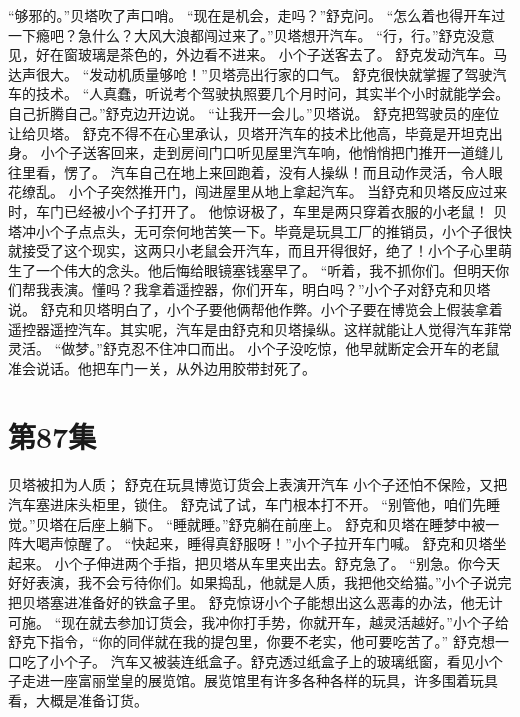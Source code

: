 \documentclass[a4paper,12pt,UTF8,twoside]{ctexbook}
\begin{document}
        “够邪的。”贝塔吹了声口哨。 
        “现在是机会，走吗？”舒克问。 
        “怎么着也得开车过一下瘾吧？急什么？大风大浪都闯过来了。”贝塔想开汽车。 
        “行，行。”舒克没意见，好在窗玻璃是茶色的，外边看不进来。 
        小个子送客去了。 
        舒克发动汽车。马达声很大。 
        “发动机质量够呛！”贝塔亮出行家的口气。 
        舒克很快就掌握了驾驶汽车的技术。 
        “人真蠢，听说考个驾驶执照要几个月时问，其实半个小时就能学会。自己折腾自己。”舒克边开边说。 
        “让我开一会儿。”贝塔说。 
        舒克把驾驶员的座位让给贝塔。 
        舒克不得不在心里承认，贝塔开汽车的技术比他高，毕竟是开坦克出身。 
        小个子送客回来，走到房间门口听见屋里汽车响，他悄悄把门推开一道缝儿往里看，愣了。 
        汽车自己在地上来回跑着，没有人操纵！而且动作灵活，令人眼花缭乱。 
        小个子突然推开门，闯进屋里从地上拿起汽车。 
        当舒克和贝塔反应过来时，车门已经被小个子打开了。 
        他惊讶极了，车里是两只穿着衣服的小老鼠！ 
        贝塔冲小个子点点头，无可奈何地苦笑一下。毕竟是玩具工厂的推销员，小个子很快就接受了这个现实，这两只小老鼠会开汽车，而且开得很好，绝了！小个子心里萌生了一个伟大的念头。他后悔给眼镜塞钱塞早了。 
        “听着，我不抓你们。但明天你们帮我表演。懂吗？我拿着遥控器，你们开车，明白吗？”小个子对舒克和贝塔说。 
        舒克和贝塔明白了，小个子要他俩帮他作弊。小个子要在博览会上假装拿着遥控器遥控汽车。其实呢，汽车是由舒克和贝塔操纵。这样就能让人觉得汽车菲常灵活。 
        “做梦。”舒克忍不住冲口而出。 
        小个子没吃惊，他早就断定会开车的老鼠准会说话。他把车门一关，从外边用胶带封死了。   \chapter{第87集} 
        贝塔被扣为人质； 
        舒克在玩具博览订货会上表演开汽车   
        小个子还怕不保险，又把汽车塞进床头柜里，锁住。 
        舒克试了试，车门根本打不开。 
        “别管他，咱们先睡觉。”贝塔在后座上躺下。 
        “睡就睡。”舒克躺在前座上。 
        舒克和贝塔在睡梦中被一阵大喝声惊醒了。 
        “快起来，睡得真舒服呀！”小个子拉开车门喊。 
        舒克和贝塔坐起来。 
        小个子伸进两个手指，把贝塔从车里夹出去。舒克急了。 
        “别急。你今天好好表演，我不会亏待你们。如果捣乱，他就是人质，我把他交给猫。”小个子说完把贝塔塞进准备好的铁盒子里。 
        舒克惊讶小个子能想出这么恶毒的办法，他无计可施。 
        “现在就去参加订货会，我冲你打手势，你就开车，越灵活越好。”小个子给舒克下指令，“你的同伴就在我的提包里，你要不老实，他可要吃苦了。” 
        舒克想一口吃了小个子。 
        汽车又被装连纸盒子。舒克透过纸盒子上的玻璃纸窗，看见小个子走进一座富丽堂皇的展览馆。展览馆里有许多各种各样的玩具，许多围着玩具看，大概是准备订货。 
\end{document}
